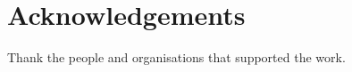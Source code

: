 \chapter*{Acknowledgements}

Thank the people and organisations that supported the work.

\cleardoublepage
